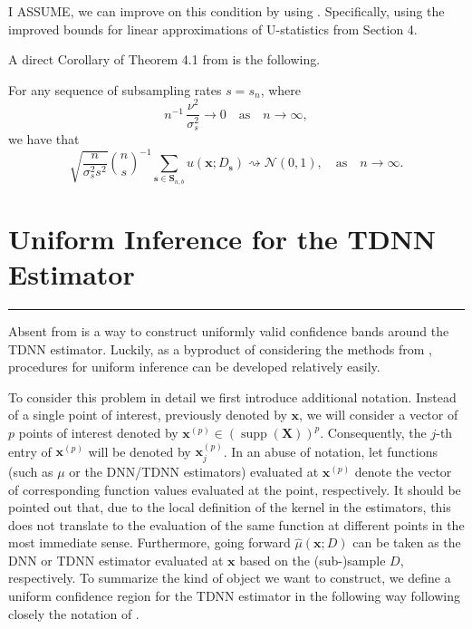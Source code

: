 \documentclass[letterpaper,10pt]{article}
\numberwithin{equation}{section}
\numberwithin{theorem}{section}
\numberwithin{remark}{section}
\numberwithin{example}{section}
\theoremstyle{definition}
\renewcommand{\hat}{\widehat}
\newcommand{\1}{\mathbb{1}}
\begin{document}
{\color{red}I ASSUME, we can improve on this condition by using \citet{ritzwoller_uniform_2024}.
		Specifically, using the improved bounds for linear approximations of U-statistics from \citet{ritzwoller_uniform_2024} Section 4.}

A direct Corollary of Theorem 4.1 from \citet{ritzwoller_uniform_2024} is the following.
\vspace{0.5cm}
\begin{corollary}
	For any sequence of subsampling rates $s = s_n$, where
	\begin{equation}
		n^{-1} \, \frac{\nu^2}{\sigma_{s}^2} \rightarrow 0
		\quad \text{as} \quad
		n \rightarrow \infty,
	\end{equation}
	we have that
	\begin{equation}
		\sqrt{\frac{n}{\sigma_{s}^2 s^2}} \binom{n}{s}^{-1} \sum_{\mathbf{s} \in \mathbf{S}_{n, b}} u\left(\mathbf{x} ; D_{\mathbf{s}}\right) \rightsquigarrow \mathcal{N}(0,1),
		\quad \text{as} \quad
		n \rightarrow \infty.
	\end{equation}
\end{corollary}

\newpage
\section{Uniform Inference for the TDNN Estimator}\label{UnifInf}
\hrule
Absent from \citet{demirkaya_optimal_2024} is a way to construct uniformly valid confidence bands around the TDNN estimator.
Luckily, as a byproduct of considering the methods from \citet{ritzwoller_uniform_2024}, procedures for uniform inference can be developed relatively easily.

To consider this problem in detail we first introduce additional notation.
Instead of a single point of interest, previously denoted by $\mathbf{x}$, we will consider a vector of $p$ points of interest denoted by $\mathbf{x}^{(p)} \in \left(\operatorname{supp}\left(\mathbf{X}\right)\right)^{p}$.
Consequently, the $j$-th entry of $\mathbf{x}^{(p)}$ will be denoted by $\mathbf{x}^{(p)}_{j}$.
In an abuse of notation, let functions (such as $\mu$ or the DNN/TDNN estimators) evaluated at $\mathbf{x}^{(p)}$ denote the vector of corresponding function values evaluated at the point, respectively.
It should be pointed out that, due to the local definition of the kernel in the estimators, this does not translate to the evaluation of the same function at different points in the most immediate sense.
Furthermore, going forward $\hat{\mu}\left(\mathbf{x}; D\right)$ can be taken as the DNN or TDNN estimator evaluated at $\mathbf{x}$ based on the (sub-)sample $D$, respectively.
To summarize the kind of object we want to construct, we define a uniform confidence region for the TDNN estimator in the following way following closely the notation of \citet{ritzwoller_uniform_2024}.
\end{document}
